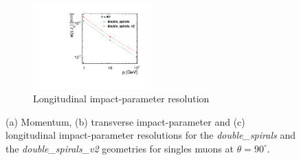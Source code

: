 \begin{figure}[H]
\begin{subfigure}[b]{\textwidth}
          \centering
          \includegraphics[width=0.5\textwidth]{Figures/Geometries/z0_resolution_double_spirals_v2_theta90.pdf}
          \caption{Longitudinal impact-parameter resolution}
          \label{}
        \end{subfigure}
        \caption{(a) Momentum, (b) transverse impact-parameter and
          (c) longitudinal impact-parameter resolutions for the {\it
            double\_spirals} and the {\it double\_spirals\_v2} geometries for singles muons at $\theta = 90^\circ$.}\label{fig:doubleSpiralsV2Res90}
\end{figure}

